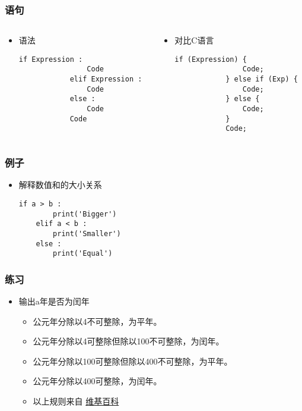 \begin{CJK}{UTF8}{gbsn}
\begin{frame} [fragile]
	\frametitle{语句}
	\linespread{1.5}
	\begin{columns}[T]
		\begin{column}[T]{.5\textwidth}
			\begin{itemize}
			\item 语法
			\begin{lstlisting}[style=pythonstyle, gobble=12]
			if Expression :
				Code
			elif Expression :
				Code
			else :
				Code
			Code
			\end{lstlisting}
			\end{itemize}
		\end{column}
		\begin{column}[T]{.5\textwidth}
			\begin{itemize}
			\item 对比C语言
			\begin{lstlisting}[style=cstyle, gobble=12]
			if (Expression) {
				Code;
			} else if (Exp) {
				Code;
			} else {
				Code;
			}
			Code;
			\end{lstlisting}
			\end{itemize}
		\end{column}
	\end{columns}
\end{frame}

\begin{frame} [fragile]
	\frametitle{例子}
	\linespread{1.25}
	\begin{itemize}
	\item 解释数值和的大小关系
	\begin{lstlisting}[style=pythonstyle, gobble=4]
	if a > b :
		print('Bigger')
	elif a < b :
		print('Smaller')
	else :
		print('Equal')
	\end{lstlisting}
	\end{itemize}
\end{frame}

\begin{frame} [fragile]
	\frametitle{练习}
	\linespread{1.5}
	\begin{itemize}
	\item 输出a年是否为闰年
		\begin{itemize}
		\item 公元年分除以4不可整除，为平年。
		\item 公元年分除以4可整除但除以100不可整除，为闰年。
		\item 公元年分除以100可整除但除以400不可整除，为平年。
		\item 公元年分除以400可整除，为闰年。
		\item 以上规则来自
				\href{https://zh.wikipedia.org/wiki/\%E9\%97\%B0\%E5\%B9\%B4}
					{维基百科}
		\end{itemize}
	\end{itemize}
\end{frame}


\end{CJK}
